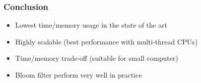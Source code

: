 \begin{frame}
	\frametitle{Conclusion}
	\centering

  \begin{itemize}
    \item Lowest time/memory usage in the state of the art
    \item Highly scalable (best performance with multi-thread CPUs)
    \item Time/memory trade-off (suitable for small computer)
    \item Bloom filter perform very well in practice
  \end{itemize}

\end{frame}
